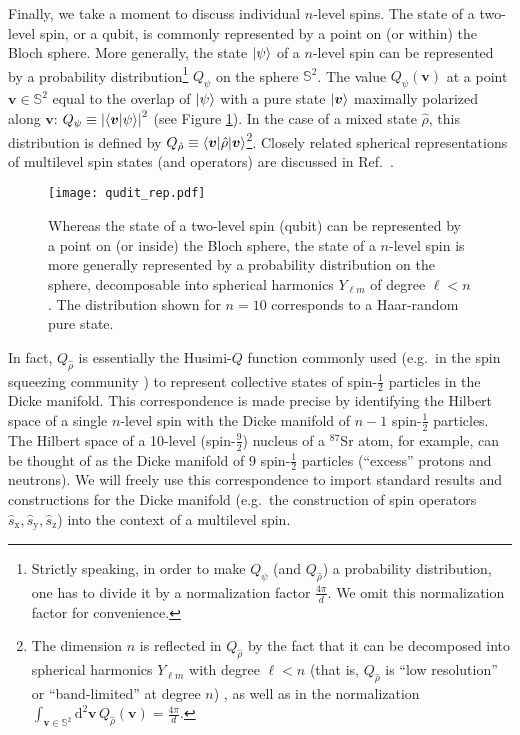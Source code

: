\documentclass[aps,pra,nofootinbib,twocolumn,superscriptaddress]{revtex4-2}
\newcommand{\p}[1]{\left(#1\right)} %
\newcommand{\bk}{\braket} %
\renewcommand{\v}{\bm} %
\renewcommand{\dd}{\text{d}} %
\newcommand{\1}{\mathds{1}}
\newcommand{\s}{\hat s}
\newcommand{\x}{\text{x}}
\newcommand{\y}{\text{y}}
\newcommand{\z}{\text{z}}
\renewcommand{\SS}{\mathbb{S}}
\begin{document}
Finally, we take a moment to discuss individual $n$-level spins.
The state of a two-level spin, or a qubit, is commonly represented by a point on (or within) the Bloch sphere.
More generally, the state $\ket\psi$ of a $n$-level spin can be represented by a probability distribution\footnote{Strictly speaking, in order to make $Q_\psi$ (and $Q_{\hat\rho}$) a probability distribution, one has to divide it by a normalization factor $\frac{4\pi}{d}$.
We omit this normalization factor for convenience.} $Q_\psi$ on the sphere $\SS^2$.
The value $Q_\psi\p{\v v}$ at a point $\v v\in\SS^2$ equal to the overlap of $\ket\psi$ with a pure state $\ket{\v v}$ maximally polarized along $\v v$: $Q_\psi\equiv\abs{\bk{\v v|\psi}}^2$ (see Figure \ref{fig:spin_dist}).
In the case of a mixed state $\hat\rho$, this distribution is defined by $Q_{\hat\rho}\equiv\bk{\v v|\hat\rho|\v v}$\footnote{The dimension $n$ is reflected in $Q_{\hat\rho}$ by the fact that it can be decomposed into spherical harmonics $Y_{\ell m}$ with degree $\ell<n$ (that is, $Q_{\hat\rho}$ is ``low resolution'' or ``band-limited'' at degree $n$) \cite{perlin2020qudit}, as well as in the normalization $\int_{\v v\in\SS^2}\dd^2\v v\,Q_{\hat\rho}\p{\v v}=\frac{4\pi}{d}$.}.
Closely related spherical representations of multilevel spin states (and operators) are discussed in Ref.~\cite{li2013weylwignermoyal}.

\begin{figure}
\centering
\texttt{[image: qudit\_rep.pdf]}
\caption{
Whereas the state of a two-level spin (qubit) can be represented by a point on (or inside) the Bloch sphere, the state of a $n$-level spin is more generally represented by a probability distribution on the sphere, decomposable into spherical harmonics $Y_{\ell m}$ of degree $\ell<n$.
The distribution shown for $n=10$ corresponds to a Haar-random pure state.
}
\label{fig:spin_dist}
\end{figure}

In fact, $Q_{\hat\rho}$ is essentially the Husimi-$Q$ function commonly used (e.g.~in the spin squeezing community \cite{ma2011quantum}) to represent collective states of spin-$\frac{1}{2}$ particles in the Dicke manifold.
This correspondence is made precise by identifying the Hilbert space of a single $n$-level spin with the Dicke manifold of $n-1$ spin-$\frac{1}{2}$ particles.
The Hilbert space of a 10-level (spin-$\frac92$) nucleus of a ${}^{87}$Sr atom, for example, can be thought of as the Dicke manifold of 9 spin-$\frac{1}{2}$ particles (``excess'' protons and neutrons).
We will freely use this correspondence to import standard results and constructions for the Dicke manifold (e.g.~the construction of spin operators $\s_\x,\s_\y,\s_\z$) into the context of a multilevel spin.
\end{document}
